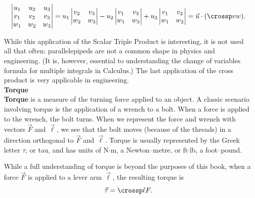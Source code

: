 \[
\begin{vmatrix} u_1 & u_2 & u_3\\ v_1 & v_2 & v_3\\ w_1 & w_2 & w_3\end{vmatrix} = u_1 \begin{vmatrix} v_2 & v_3\\ w_2 & w_3\end{vmatrix} - u_2\begin{vmatrix} v_1 & v_3\\ w_1 & w_3\end{vmatrix} + u_3\begin{vmatrix} v_1 & v_2\\ w_1 & w_2\end{vmatrix} = \vec u \cdot(\crossp vw).
\]


While this application of the Scalar Triple Product is interesting, it is not used all that often: parallelepipeds are not a common shape in physics and engineering. (It is, however, essential to understanding the change of variables formula for multiple integrals in Calculus.) The last application of the cross product is very applicable in engineering.\\

\noindent\textbf{Torque}\\

\textbf{Torque} is a measure of the turning force applied to an object. A classic scenario involving torque is the application of a wrench to a bolt. When a force is applied to the wrench, the bolt turns. When we represent the force and wrench with vectors $\vec F$ and $\vec \ell$, we see that the bolt moves (because of the threads) in a  direction orthogonal to $\vec F$ and $\vec \ell$. Torque is usually represented by the Greek letter $\tau$, or tau, and has units of N$\cdot$m, a Newton--metre, or ft$\cdot$lb, a foot--pound.

While a full understanding of torque is beyond the purposes of this book, when a force $\vec F$ is applied to a lever arm $\vec \ell$, the resulting torque is \begin{equation}\vec \tau = \crossp \ell F.\label{eq:crossp3}\end{equation}

